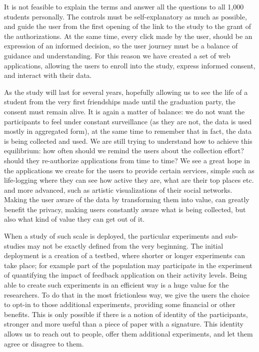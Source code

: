 It is not feasible to explain the terms and answer all the questions to all 1,000 students personally. The controls must be self-explanatory as much as possible, and guide the user from the first opening of the link to the study to the grant of the authorizations. At the same time, every click made by the user, should be an expression of an informed decision, so the user journey must be a balance of guidance and understanding. For this reason we have created a set of web applications, allowing the users to enroll into the study, express informed consent, and interact with their data.

As the study will last for several years, hopefully allowing us to see the life of a student from the very first friendships made until the graduation party, the consent must remain alive. It is again a matter of balance: we do not want the participants to feel under constant surveillance (as they are not, the data is used mostly in aggregated form), at the same time to remember that in fact, the data is being collected and used. We are still trying to understand how to achieve this equilibrium: how often should we remind the users about the collection effort? should they re-authorize applications from time to time? We see a great hope in the applications we create for the users to provide certain services, simple such as life-logging where they can see how active they are, what are their top places etc. and more advanced, such as artistic visualizations of their social networks. Making the user aware of the data by transforming them into value, can greatly benefit the privacy, making users constantly aware what is being collected, but also what kind of value they can get out of it.

When a study of such scale is deployed, the particular experiments and sub-studies may not be exactly defined from the very beginning. The initial deployment is a creation of a testbed, where shorter or longer experiments can take place; for example part of the population may participate in the experiment of quantifying the impact of feedback application on their activity levels. Being able to create such experiments in an efficient way is a huge value for the researchers. To do that in the most frictionless way, we give the users the choice to opt-in to those additional experiments, providing some financial or other benefits. This is only possible if there is a notion of identity of the participants, stronger and more useful than a piece of paper with a signature. This identity allows us to reach out to people, offer them additional experiments, and let them agree or disagree to them.

